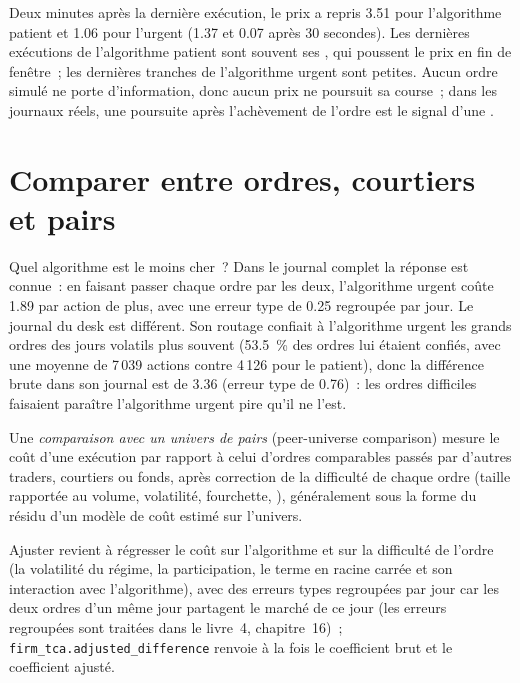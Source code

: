 Deux minutes après la dernière exécution, le prix a repris 3.51  pour l'algorithme patient et 1.06 pour l'urgent (1.37 et 0.07 après 30
secondes). Les dernières exécutions de l'algorithme patient sont souvent ses , qui poussent le prix en fin de fenêtre~; les dernières
tranches de l'algorithme urgent sont petites. Aucun ordre simulé ne porte d'information, donc aucun prix ne poursuit sa course~; dans les journaux réels, une poursuite après l'achèvement de l'ordre est le signal d'une .

\section{Comparer entre ordres, courtiers et pairs}

Quel algorithme est le moins cher~? Dans le journal complet la réponse est connue~: en faisant passer chaque ordre par les deux, l'algorithme urgent coûte 1.89  par action de plus,
avec une erreur type de 0.25 regroupée par jour. Le journal du desk est différent. Son routage confiait à l'algorithme urgent les grands ordres des jours volatils plus
souvent (53.5~\% des ordres lui étaient confiés, avec une moyenne de 7\,039 actions contre 4\,126 pour le patient), donc la différence brute dans son journal est de 3.36 
(erreur type de 0.76)~: les ordres difficiles faisaient paraître l'algorithme urgent pire qu'il ne l'est.

\begin{definition}\label{def:mx:transaction-cost-analysis:peer}
Une \emph{comparaison avec un univers de pairs} (peer-universe comparison) mesure le coût d'une exécution par rapport à celui d'ordres comparables passés par d'autres traders,
courtiers ou fonds, après correction de la difficulté de chaque ordre (taille rapportée au volume, volatilité, fourchette, ), généralement sous la forme du résidu d'un modèle de
coût estimé sur l'univers.
\end{definition}

Ajuster revient à régresser le coût sur l'algorithme et sur la difficulté de l'ordre (la volatilité du régime, la participation, le terme en racine carrée
et son interaction avec l'algorithme), avec des erreurs types regroupées par jour car les deux ordres d'un même jour partagent le marché de ce jour (les erreurs regroupées sont traitées dans le
livre~4, chapitre~16)~; \texttt{firm\_tca.adjusted\_difference} renvoie à la fois le coefficient brut et le coefficient ajusté.

